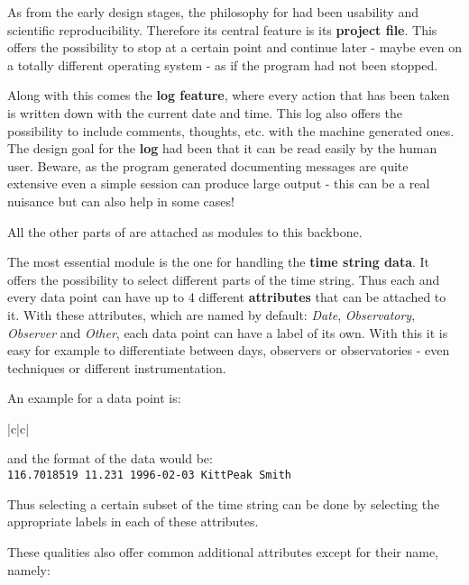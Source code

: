 As from the early design stages, the philosophy for \period had been
usability and scientific reproducibility. Therefore its central feature is 
its {\bf project file}. This offers the possibility to stop at a certain point 
and continue later - maybe even on a totally 
different operating system - as if the program had not been stopped.

Along with this comes the {\bf log feature}, where every action that has been 
taken is written down with the current date and time. This log 
also offers the possibility to include comments, thoughts, etc.
with the machine generated ones.
The design goal for the {\bf log} had been that it can
be read easily by the human user.
Beware, as the program generated documenting messages 
are quite extensive even a simple session can produce large output - 
this can be a real nuisance but can also help in some cases!

All the other parts of \period are attached as modules to this backbone.

The most essential module is the one for handling the {\bf time string data}.
It offers the possibility to select different parts of the time string.
Thus each and every data point can have up to 4 different 
{\bf attributes} that can  be attached to it. 
With these attributes, which are named by default:
{\it Date}, {\it Observatory}, {\it Observer} and {\it Other},
each data point can have a label of its own. With this it is easy 
for example to differentiate between days, 
observers or observatories - even techniques
or different instrumentation.

An example for a data point is:

\begin{tabular}{|c|c|}\hline
{}
\end{tabular}

and the format of the data would be:\\
{\tt 116.7018519     11.231  1996-02-03      KittPeak    Smith}

Thus selecting a certain subset of the time string can be done 
by selecting the appropriate labels in each of these attributes. 


These qualities also offer common additional attributes except for 
their name, namely:


